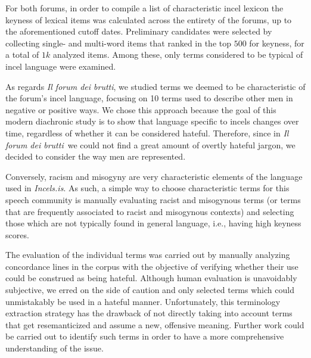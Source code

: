 \documentclass[11pt]{article}
\newcommand{\enforum}{\textit{Incels.is}}
\newcommand{\itforum}{\textit{Il forum dei brutti}}
\begin{document}
For both forums, in order to compile a list of characteristic incel lexicon the keyness of lexical items was calculated across the entirety of the forums, up to the aforementioned cutoff dates. Preliminary candidates were selected by
collecting single- and multi-word items that ranked in the top $500$ for keyness, for a total of $1k$ analyzed items.  Among these, only terms considered to be typical of incel language were examined.

As regards \itforum, we studied terms we deemed to be characteristic of the forum's incel language, focusing on 10 terms used to describe other men in negative or positive ways. We chose this approach because the goal of this modern diachronic study is to show that language specific to incels changes over time, regardless of whether it can be considered hateful. Therefore, since in \itforum\, we could not find a great amount of overtly hateful jargon, we decided to consider the way men are represented.

Conversely, racism and misogyny are very characteristic elements of the language used in \enforum. As such, a simple way to choose characteristic terms for this speech community is manually evaluating racist and misogynous terms (or terms that are frequently associated to racist and misogynous contexts) and selecting those which are not typically found in general language, i.e., having high keyness scores.

The evaluation of the individual terms was carried out by manually analyzing concordance lines in the corpus with the objective of verifying whether their use could be construed as being hateful. Although human evaluation is unavoidably subjective, we erred on the side of caution and only selected terms which could unmistakably be used in a hateful manner. Unfortunately, this terminology extraction strategy has the drawback of not directly taking into account terms that get resemanticized and assume a new, offensive meaning. Further work could be carried out to identify such terms in order to have a more comprehensive understanding of the issue.

\end{document}
